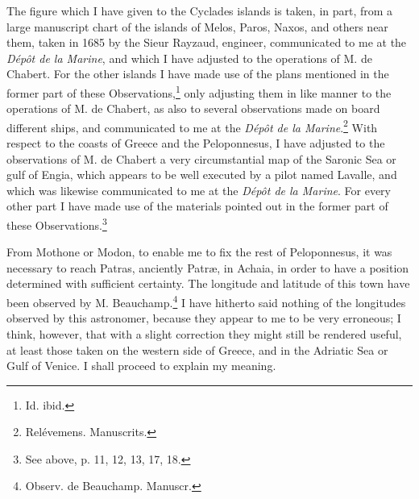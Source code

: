 \documentclass[a4paper, 11pt, oneside, polutonikogreek, english]{article}
\begin{document}
The figure which I have given to the Cyclades islands is taken, in part, from a large manuscript chart of the islands of Melos, Paros, Naxos, and others near them, taken in 1685 by the Sieur Rayzaud, engineer, communicated to me at the \emph{Dépôt de la Marine}, and which I have adjusted to the operations of M. de Chabert. For the other islands I have made use of the plans mentioned in the former part of these Observations,\footnote{Id. ibid.} only adjusting them in like manner to the operations of M. de Chabert, as also to several observations made on board different ships, and communicated to me at the \emph{Dépôt de la Marine}.\footnote{Relévemens. Manuscrits.} With respect to the coasts of Greece and the Peloponnesus, I have adjusted to the observations of M. de Chabert a very circumstantial map of the Saronic Sea or gulf of Engia, which appears to be well executed by a pilot named Lavalle, and which was likewise communicated to me at the \emph{Dépôt de la Marine}. For every other part I have made use of the materials pointed out in the former part of these Observations.\footnote{See above, p. 11, 12, 13, 17, 18.}

From Mothone or Modon, to enable me to fix the rest of Peloponnesus, it was necessary to reach Patras, anciently Patræ, in Achaia, in order to have a position determined with sufficient certainty. The longitude and latitude of this town have been observed by M. Beauchamp.\footnote{Observ. de Beauchamp. Manuscr.} I have hitherto said nothing of the longitudes observed by this astronomer, because they appear to me to be very erroneous; I think, however, that with a slight correction they might still be rendered useful, at least those taken on the western side of Greece, and in the Adriatic Sea or Gulf of Venice. I shall proceed to explain my meaning.
\end{document}
